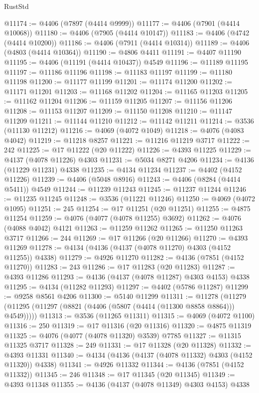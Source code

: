 \begin{lexlean}{RustStd}
\begin{coremodule}
{\begin{coremodule}
{{{{{{{{{{{{{{{{{{{{{{{{{{{{{{{{{{{{{{{{{{{{{{{{{{@11174 := @4406 (@7897 (@4414 @9999))
@11177 := @4406 (@7901 (@4414 @10068))
@11180 := @4406 (@7905 (@4414 @10147))
@11183 := @4406 (@4742 (@4414 @10200))
@11186 := @4406 (@7911 (@4414 @10314))
@11189 := @4406 (@4803 (@4414 @10364))
@11190 := @4806 @4411
@11191 := @4407 @11190
@11195 := @4406 (@11191 (@4414 @10437)) @4549
@11196 := @11189 @11195
@11197 := @11186 @11196
@11198 := @11183 @11197
@11199 := @11180 @11198
@11200 := @11177 @11199
@11201 := @11174 @11200
@11202 := @11171 @11201
@11203 := @11168 @11202
@11204 := @11165 @11203
@11205 := @11162 @11204
@11206 := @11159 @11205
@11207 := @11156 @11206
@11208 := @11153 @11207
@11209 := @11150 @11208
@11210 := @11147 @11209
@11211 := @11144 @11210
@11212 := @11142 @11211
@11214 := @3536 (@11130 @11212)
@11216 := @4069 (@4072 @1049)
@11218 := @4076 (@4083 @4042)
@11219 := @11218 @8257
@11221 := @11216 @11219 @3717
@11222 := 242
@11225 := @17 @11222 (@20 @11222)
@11226 := @4393 @11225
@11229 := @4137 (@4078 @11226) @4303
@11231 := @5034 @8271 @4206
@11234 := @4136 (@11229 @11231) @4338
@11235 := @4134 @11234
@11237 := @4402 (@4152 @11226)
@11239 := @4406 (@5048 @8916)
@11243 := @4406 (@8284 (@4414 @5411)) @4549
@11244 := @11239 @11243
@11245 := @11237 @11244
@11246 := @11235 @11245
@11248 := @3536 (@11221 @11246)
@11250 := @4069 (@4072 @1095)
@11251 := 245
@11254 := @17 @11251 (@20 @11251)
@11255 := @4875 @11254
@11259 := @4076 (@4077 (@4078 @11255) @3692)
@11262 := @4076 (@4088 @4042) @4121
@11263 := @11259 @11262
@11265 := @11250 @11263 @3717
@11266 := 244
@11269 := @17 @11266 (@20 @11266)
@11270 := @4393 @11269
@11278 := @4134 (@4136 (@4137 (@4078 @11270) @4303 (@4152 @11255)) @4338)
@11279 := @4926 @11270
@11282 := @4136 (@7851 (@4152 @11270))
@11283 := 243
@11286 := @17 @11283 (@20 @11283)
@11287 := @4393 @11286
@11293 := @4136 (@4137 (@4078 @11287) @4303 @4153) @4338
@11295 := @4134 (@11282 @11293)
@11297 := @4402 (@5786 @11287)
@11299 := @9258 @8561 @4206
@11300 := @5140 @11299
@11311 := @11278
    (@11279 (@11295 (@11297 (@8821 (@4406 (@5807 (@4414 (@11300 @8858 @8864))) @4549)))))
@11313 := @3536 (@11265 @11311)
@11315 := @4069 (@4072 @1100)
@11316 := 250
@11319 := @17 @11316 (@20 @11316)
@11320 := @4875 @11319
@11325 := @4076 (@4077 (@4078 @11320) @3539) @7785
@11327 := @11315 @11325 @3717
@11328 := 249
@11331 := @17 @11328 (@20 @11328)
@11332 := @4393 @11331
@11340 := @4134 (@4136 (@4137 (@4078 @11332) @4303 (@4152 @11320)) @4338)
@11341 := @4926 @11332
@11344 := @4136 (@7851 (@4152 @11332))
@11345 := 246
@11348 := @17 @11345 (@20 @11345)
@11349 := @4393 @11348
@11355 := @4136 (@4137 (@4078 @11349) @4303 @4153) @4338
}}}}}}}}}}}}}}}}}}}}}}}}}}}}}}}}}}}}}}}}}}}}}}}}}}
\end{coremodule}}
\end{coremodule}
\end{lexlean}
